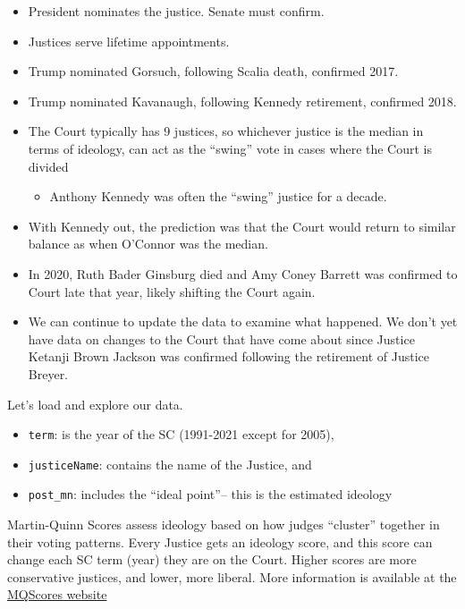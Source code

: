 \documentclass[
  letterpaper,
  DIV=11,
  numbers=noendperiod]{scrreprt}
\providecommand{\tightlist}{%
  \setlength{\itemsep}{0pt}\setlength{\parskip}{0pt}}\usepackage{longtable,booktabs,array}
\begin{document}
\begin{itemize}
\tightlist
\item
  President nominates the justice. Senate must confirm.
\item
  Justices serve lifetime appointments.
\item
  Trump nominated Gorsuch, following Scalia death, confirmed 2017.
\item
  Trump nominated Kavanaugh, following Kennedy retirement, confirmed
  2018.
\item
  The Court typically has 9 justices, so whichever justice is the median
  in terms of ideology, can act as the ``swing'' vote in cases where the
  Court is divided

  \begin{itemize}
  \tightlist
  \item
    Anthony Kennedy was often the ``swing'' justice for a decade.
  \end{itemize}
\item
  With Kennedy out, the prediction was that the Court would return to
  similar balance as when O'Connor was the median.
\item
  In 2020, Ruth Bader Ginsburg died and Amy Coney Barrett was confirmed
  to Court late that year, likely shifting the Court again.
\item
  We can continue to update the data to examine what happened. We don't
  yet have data on changes to the Court that have come about since
  Justice Ketanji Brown Jackson was confirmed following the retirement
  of Justice Breyer.
\end{itemize}

Let's load and explore our data.

\begin{itemize}
\tightlist
\item
  \texttt{term}: is the year of the SC (1991-2021 except for 2005),
\item
  \texttt{justiceName}: contains the name of the Justice, and\\
\item
  \texttt{post\_mn}: includes the ``ideal point''-- this is the
  estimated ideology
\end{itemize}

Martin-Quinn Scores assess ideology based on how judges ``cluster''
together in their voting patterns. Every Justice gets an ideology score,
and this score can change each SC term (year) they are on the Court.
Higher scores are more conservative justices, and lower, more liberal.
More information is available at the
\href{http://mqscores.lsa.umich.edu/measures.php}{MQScores website}
\end{document}
